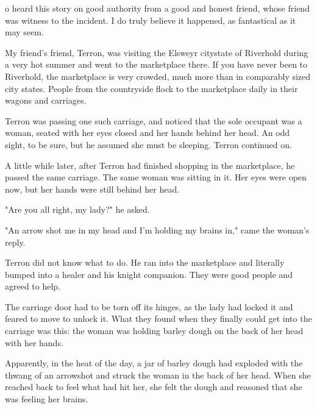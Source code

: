 
o heard this story on good authority from a good and honest friend, whose friend was witness to the incident. I do truly believe it happened, as fantastical as it may seem.

My friend's friend, Terron, was visiting the Elsweyr citystate of Riverhold during a very hot summer and went to the marketplace there. If you have never been to Riverhold, the marketplace is very crowded, much more than in comparably sized city states. People from the countryside flock to the marketplace daily in their wagons and carriages.

Terron was passing one such carriage, and noticed that the sole occupant was a woman, seated with her eyes closed and her hands behind her head. An odd sight, to be sure, but he assumed she must be sleeping. Terron continued on.

A little while later, after Terron had finished shopping in the marketplace, he passed the same carriage. The same woman was sitting in it. Her eyes were open now, but her hands were still behind her head.

"Are you all right, my lady?" he asked.

"An arrow shot me in my head and I'm holding my brains in," came the woman's reply.

Terron did not know what to do. He ran into the marketplace and literally bumped into a healer and his knight companion. They were good people and agreed to help.

The carriage door had to be torn off its hinges, as the lady had locked it and feared to move to unlock it. What they found when they finally could get into the carriage was this: the woman was holding barley dough on the back of her head with her hands.

Apparently, in the heat of the day, a jar of barley dough had exploded with the thwang of an arrowshot and struck the woman in the back of her head. When she reached back to feel what had hit her, she felt the dough and reasoned that she was feeling her brains.